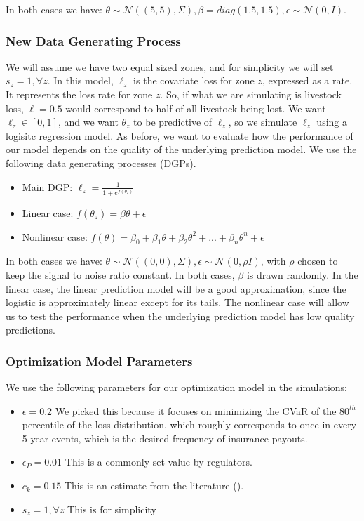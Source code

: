 \documentclass[11pt]{article}
\begin{document}
    In both cases we have: $\theta \sim \mathcal{N}((5,5),\Sigma), \beta = diag(1.5,1.5), \epsilon \sim \mathcal{N}(0,I)$.

\subsubsection{New Data Generating Process}
 We will assume we have two equal sized zones, and for simplicity we will set $s_z = 1, \forall z$. In this model, $\ell_z$ is the covariate loss for zone $z$, expressed as a rate. It represents the loss rate for zone $z$. So, if what we are simulating is livestock loss, $\ell=0.5$ would correspond to half of all livestock being lost. We want $\ell_z \in [0,1]$, and we want $\theta_z$ to be predictive of $\ell_z$, so we simulate $\ell_z$ using a logisitc regression model. As before, we want to evaluate how the performance of our model depends on the quality of the underlying prediction model. We use the following data generating processes (DGPs).

\begin{itemize}
    \item Main DGP: $\ell_z = \frac{1}{1+e^{f(\theta_z)}}$
    \item Linear case: $f(\theta_z) = \beta \theta + \epsilon$
    \item Nonlinear case: $f(\theta) = \beta_0 + \beta_1 \theta + \beta_2 \theta^2 + ... + \beta_n \theta^n+ \epsilon$
  \end{itemize}

In both cases we have: $\theta \sim \mathcal{N}((0,0),\Sigma), \epsilon \sim \mathcal{N}(0,\rho I)$, with $\rho$ chosen to keep the signal to noise ratio constant. In both cases, $\beta$ is drawn randomly. In the linear case, the linear prediction model will be a good approximation, since the logistic  is approximately linear except for its tails. The nonlinear case will allow us to test the performance when the underlying prediction model has low quality predictions. 


   \subsubsection{Optimization Model Parameters}
     We use the following parameters for our optimization model in the simulations:

     \begin{itemize}
       \item $\epsilon=0.2$ We picked this because it focuses on minimizing the CVaR of the $80^{th}$ percentile of the loss distribution, which roughly corresponds to once in every 5 year events, which is the desired frequency of insurance payouts.  
       \item $\epsilon_P=0.01$ This is a commonly set value by regulators.  
       \item $c_k=0.15$ This is an estimate from the literature (\cite{kielholz2000cost}). 
       \item $s_z = 1, \forall z$ This is for simplicity
   \end{itemize}
\end{document}
